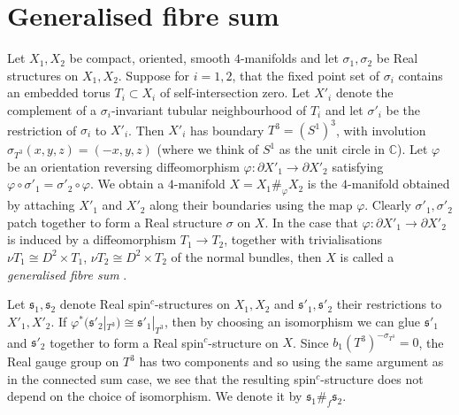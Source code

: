 \documentclass{amsart}
\theoremstyle{definition}
\theoremstyle{remark}
\numberwithin{equation}{section}
\begin{document}
\section{Generalised fibre sum}\label{sec:gfs}

Let $X_1,X_2$ be compact, oriented, smooth $4$-manifolds and let $\sigma_1,\sigma_2$ be Real structures on $X_1,X_2$. Suppose for $i=1,2$, that the fixed point set of $\sigma_i$ contains an embedded torus $T_i \subset X_i$ of self-intersection zero. Let $X'_i$ denote the complement of a $\sigma_i$-invariant tubular neighbourhood of $T_i$ and let $\sigma'_i$ be the restriction of $\sigma_i$ to $X'_i$. Then $X'_i$ has boundary $T^3 = (S^1)^3$, with involution $\sigma_{T^3}(x,y,z) = (-x,y,z)$ (where we think of $S^1$ as the unit circle in $\mathbb{C}$). Let $\varphi$ be an orientation reversing diffeomorphism $\varphi : \partial X'_1 \to \partial X'_2$ satisfying $\varphi \circ \sigma'_1 = \sigma'_2 \circ \varphi$. We obtain a $4$-manifold $X = X_1 \#_\varphi X_2$ is the $4$-manifold obtained by attaching $X'_1$ and $X'_2$ along their boundaries using the map $\varphi$. Clearly $\sigma'_1, \sigma'_2$ patch together to form a Real structure $\sigma$ on $X$. In the case that $\varphi : \partial X'_1 \to \partial X'_2$ is induced by a diffeomorphism $T_1 \to T_2$, together with trivialisations $\nu T_1 \cong D^2 \times T_1$, $\nu T_2 \cong D^2 \times T_2$ of the normal bundles, then $X$ is called a {\em generalised fibre sum} \cite[Definition 7.1.11]{gs}. 

Let $\mathfrak{s}_1, \mathfrak{s}_2$ denote Real spin$^c$-structures on $X_1,X_2$ and $\mathfrak{s}'_1, \mathfrak{s}'_2$ their restrictions to $X'_1, X'_2$. If $\varphi^*(\mathfrak{s}'_2 |_{T^3}) \cong \mathfrak{s}'_1 |_{T^3}$, then by choosing an isomorphism we can glue $\mathfrak{s}'_1$ and $\mathfrak{s}'_2$ together to form a Real spin$^c$-structure on $X$. Since $b_1(T^3)^{-\sigma_{T^3}} = 0$, the Real gauge group on $T^3$ has two components and so using the same argument as in the connected sum case, we see that the resulting spin$^c$-structure does not depend on the choice of isomorphism. We denote it by $\mathfrak{s}_1 \#_f \mathfrak{s}_2$.
\end{document}
